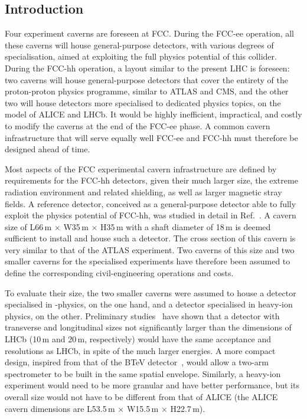 \subsection{Introduction}

Four experiment caverns are foreseen at FCC. 
During the FCC-ee operation, all these caverns will house general-purpose detectors, 
with various degrees of specialisation, aimed at exploiting the full physics potential of this collider.
During the \mbox{FCC-hh} operation, a layout similar to the present LHC is foreseen: 
two caverns will house general-purpose detectors that cover the entirety of the proton-proton physics programme, 
similar to ATLAS and CMS, and the other two will house detectors more specialised to dedicated physics topics, 
on the model of ALICE and LHCb. 
It would be highly inefficient, impractical, and costly to modify the caverns at the end of the FCC-ee phase.
A common cavern infrastructure that will serve equally well FCC-ee and FCC-hh must therefore be designed ahead of time.

Most aspects of the FCC experimental cavern infrastructure are defined by requirements for the FCC-hh detectors, 
given their much larger size, the extreme radiation environment and related shielding, as well as larger magnetic stray fields. 
A reference detector, conceived as a general-purpose detector able to fully exploit the physics potential of FCC-hh, 
was studied in detail in Ref.~\cite{Mangano:2022ukr}. 
A cavern size of L66\,m $\times$ W35\,m $\times$ H35\,m with a shaft diameter of 18\,m 
is deemed sufficient to install and house such a detector. 
The cross section of this cavern is very similar to that of the ATLAS experiment. 
Two caverns of this size and two smaller caverns for the specialised experiments have therefore been assumed 
to define the corresponding civil-engineering operations and costs.

To evaluate their size, the two smaller caverns were assumed to house 
a detector specialised in \PB-physics, on the one hand, and 
a detector specialised in heavy-ion physics, on the other. 
Preliminary studies~\cite{Chobanova:2020vmx,Prouvetalk} have shown that 
a detector with transverse and longitudinal sizes not significantly larger than the dimensions of LHCb 
(10\,m and 20\,m, respectively) 
would have the same acceptance and resolutions as LHCb, in spite of the much larger energies. 
A more compact design, 
inspired from that of the BTeV detector~\cite{Kulyavtsev:1999tcg},
would allow a two-arm spectrometer to be built in the same spatial envelope. 
Similarly, a heavy-ion experiment would need to be more granular and have better performance, 
but its overall size would not have to be different from that of ALICE
(the ALICE cavern dimensions are L53.5\,m $\times$ W15.5\,m $\times$ H22.7\,m).

